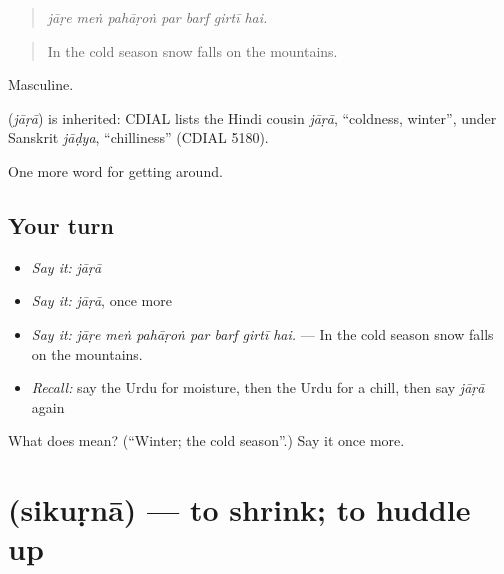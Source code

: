 \begin{quote}
      
\end{quote}

\begin{quote}
\emph{jāṛe meṅ pahāṛoṅ par barf girtī hai.}
\end{quote}

\begin{quote}
In the cold season snow falls on the mountains.
\end{quote}

Masculine.

\begin{cousinweb}
\textbf{} (\emph{jāṛā}) is inherited: CDIAL lists the Hindi cousin \emph{jāṛā}, \textquotedblleft{}coldness, winter\textquotedblright{}, under Sanskrit \emph{jāḍya}, \textquotedblleft{}chilliness\textquotedblright{} (CDIAL 5180).
\end{cousinweb}

\begin{grammarlens}[title={What you've built}]
One more word for getting around.
\end{grammarlens}

\subsection*{Your turn}
\begin{itemize}
\raggedright
  \item \emph{Say it:} \emph{jāṛā}
  \item \emph{Say it:} \emph{jāṛā}, once more
  \item \emph{Say it:} \emph{jāṛe meṅ pahāṛoṅ par barf girtī hai.} — In the cold season snow falls on the mountains.
  \item \emph{Recall:} say the Urdu for moisture, then the Urdu for a chill, then say \emph{jāṛā} again
\end{itemize}

\begin{tcolorbox}[breakable,colback=teal!4,colframe=teal!35!black,title={Before you move on}]
What does  mean? (\textquotedblleft{}Winter; the cold season\textquotedblright{}.) Say it once more.
\end{tcolorbox}
\section[\texorpdfstring{\ur{سکڑنا} (sikuṛnā)}{سکڑنا (sikuṛnā)}]{ (sikuṛnā) — to shrink; to huddle up}

